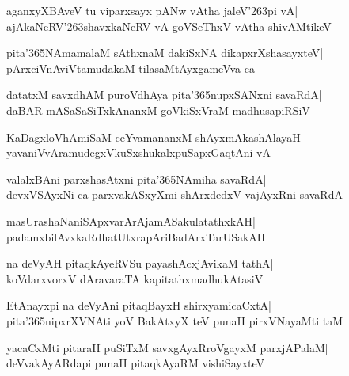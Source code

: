 \documentclass[twoside,12pt,openright]{book}
\newcounter{shloka}[chapter]
\begin{document}
\begin{shloka}%
aganxyXBAveV tu viparxsayx pANw vAtha jaleV\char'263pi vA|\\
ajAkaNeRV\char'263shavxkaNeRV vA goVSeThxV vAtha shivAMtikeV
\end{shloka}

\begin{shloka}%
pita\char'365NAmamalaM sAthxnaM dakiSxNA dikapxrXshasayxteV|\\
pArxciVnAviVtamudakaM tilasaMtAyxgameVva ca
\end{shloka}

\begin{shloka}%
datatxM savxdhAM puroVdhAya pita\char'365nupxSANxni savaRdA|\\
daBAR mASaSaSiTxkAnanxM goVkiSxVraM madhusapiRSiV
\end{shloka}

\begin{shloka}%
KaDagxloVhAmiSaM ceYvamananxM shAyxmAkashAlayaH|\\
yavaniVvAramudegxVkuSxshukalxpuSapxGaqtAni vA
\end{shloka}

\begin{shloka}%
valalxBAni parxshasAtxni pita\char'365NAmiha savaRdA|\\
devxVSAyxNi ca parxvakASxyXmi shArxdedxV vajAyxRni savaRdA
\end{shloka}

\begin{shloka}%
masUrashaNaniSApxvarArAjamASakulatathxkAH|\\
padamxbilAvxkaRdhatUtxrapAriBadArxTarUSakAH
\end{shloka}

\begin{shloka}%
na deVyAH pitaqkAyeRVSu payashAcxjAvikaM tathA|\\
koVdarxvorxV dAravaraTA kapitathxmadhukAtasiV
\end{shloka}

\begin{shloka}%
EtAnayxpi na deVyAni pitaqBayxH shirxyamicaCxtA|\\
pita\char'365nipxrXVNAti yoV BakAtxyX teV punaH pirxVNayaMti taM 
\end{shloka}

\begin{shloka}%
yacaCxMti pitaraH puSiTxM savxgAyxRroVgayxM parxjAPalaM|\\
deVvakAyARdapi punaH pitaqkAyaRM vishiSayxteV
\end{shloka}
\end{document}

